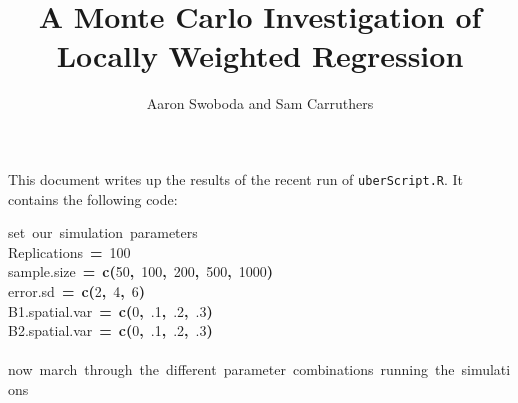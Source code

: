 \documentclass{article}
\title{A Monte Carlo Investigation of Locally Weighted Regression}
\author{Aaron Swoboda and Sam Carruthers}
\makeatletter
\newcommand{\hlnumber}[1]{\textcolor[rgb]{0,0,0}{#1}}%
\newcommand{\hlfunctioncall}[1]{\textcolor[rgb]{0.501960784313725,0,0.329411764705882}{\textbf{#1}}}%
\newcommand{\hlkeyword}[1]{\textcolor[rgb]{0,0,0}{\textbf{#1}}}%
\newcommand{\hlcomment}[1]{\textcolor[rgb]{0.180392156862745,0.6,0.341176470588235}{#1}}%
\newcommand{\hlassignement}[1]{\textcolor[rgb]{0,0,0}{\textbf{#1}}}%
\newcommand{\hlsymbol}[1]{\textcolor[rgb]{0,0,0}{#1}}%
\newcommand{\hlstd}[1]{\textcolor[rgb]{0,0,0}{#1}}%
\newenvironment{kframe}{%
 \def\FrameCommand##1{\hskip\@totalleftmargin \hskip-\fboxsep
 \colorbox{shadecolor}{##1}\hskip-\fboxsep
     \hskip-\linewidth \hskip-\@totalleftmargin \hskip\columnwidth}%
 \MakeFramed {\advance\hsize-\width
   \@totalleftmargin\z@ \linewidth\hsize
   \@setminipage}}%
 {\par\unskip\endMakeFramed}
\newenvironment{knitrout}{}{} %
\makeatother
\begin{document}
\maketitle

This document writes up the results of the recent run of \texttt{uberScript.R}. It contains the following code:

\begin{knitrout}
\color{fgcolor}\begin{kframe}
\begin{flushleft}
\ttfamily\noindent
\hlcomment{\usebox{\hlnormalsizeboxhash}{\ }set{\ }our{\ }simulation{\ }parameters}\hspace*{\fill}\\
\hlstd{}\hlsymbol{Replications}{\ }\hlassignement{=}{\ }\hlnumber{100}\hspace*{\fill}\\
\hlstd{}\hlsymbol{sample.size}{\ }\hlassignement{=}{\ }\hlfunctioncall{c}\hlkeyword{(}\hlnumber{50}\hlkeyword{,}{\ }\hlnumber{100}\hlkeyword{,}{\ }\hlnumber{200}\hlkeyword{,}{\ }\hlnumber{500}\hlkeyword{,}{\ }\hlnumber{1000}\hlkeyword{)}\hspace*{\fill}\\
\hlstd{}\hlsymbol{error.sd}{\ }\hlassignement{=}{\ }\hlfunctioncall{c}\hlkeyword{(}\hlnumber{2}\hlkeyword{,}{\ }\hlnumber{4}\hlkeyword{,}{\ }\hlnumber{6}\hlkeyword{)}\hspace*{\fill}\\
\hlstd{}\hlsymbol{B1.spatial.var}{\ }\hlassignement{=}{\ }\hlfunctioncall{c}\hlkeyword{(}\hlnumber{0}\hlkeyword{,}{\ }\hlnumber{.1}\hlkeyword{,}{\ }\hlnumber{.2}\hlkeyword{,}{\ }\hlnumber{.3}\hlkeyword{)}\hspace*{\fill}\\
\hlstd{}\hlsymbol{B2.spatial.var}{\ }\hlassignement{=}{\ }\hlfunctioncall{c}\hlkeyword{(}\hlnumber{0}\hlkeyword{,}{\ }\hlnumber{.1}\hlkeyword{,}{\ }\hlnumber{.2}\hlkeyword{,}{\ }\hlnumber{.3}\hlkeyword{)}\hspace*{\fill}\\
\hlstd{}\hspace*{\fill}\\
\hlstd{}\hlcomment{\usebox{\hlnormalsizeboxhash}{\ }now{\ }march{\ }through{\ }the{\ }different{\ }parameter{\ }combinations{\ }running{\ }the{\ }simulations}\hspace*{\fill}\\
\hlstd{}\hspace*{\fill}\\

\end{flushleft}
\end{kframe}
\end{knitrout}
\end{document}
